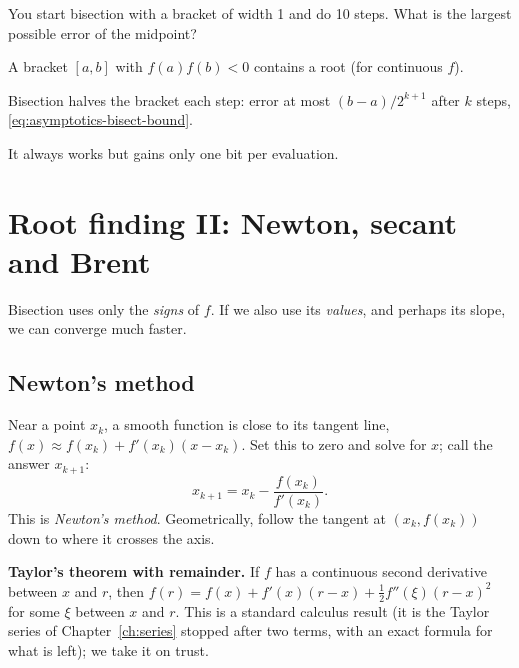 \begin{checkpoint}
You start bisection with a bracket of width 1 and do 10 steps. What is the largest possible error of the midpoint?
\end{checkpoint}

\begin{keyideas}
\item A bracket $[a,b]$ with $f(a)f(b)<0$ contains a root (for continuous $f$).
\item Bisection halves the bracket each step: error at most $(b-a)/2^{k+1}$ after $k$ steps, \cref{eq:asymptotics-bisect-bound}.
\item It always works but gains only one bit per evaluation.
\end{keyideas}

\section{Root finding II: Newton, secant and Brent}\label{sec:asymptotics-newton}

Bisection uses only the \emph{signs} of $f$. If we also use its \emph{values}, and perhaps its slope, we can converge much faster.

\subsection{Newton's method}

Near a point $x_k$, a smooth function is close to its tangent line, $f(x)\approx f(x_k)+f'(x_k)(x-x_k)$. Set this to zero and solve for $x$; call the answer $x_{k+1}$:
\begin{equation}
x_{k+1}=x_k-\frac{f(x_k)}{f'(x_k)} .
\label{eq:asymptotics-newton}
\end{equation}
This is \emph{Newton's method}. Geometrically, follow the tangent at $(x_k,f(x_k))$ down to where it crosses the axis.

\begin{beyond}
\textbf{Taylor's theorem with remainder.} If $f$ has a continuous second derivative between $x$ and $r$, then
$f(r)=f(x)+f'(x)(r-x)+\tfrac12f''(\xi)(r-x)^2$ for some $\xi$ between $x$ and $r$. This is a standard calculus result (it is the Taylor series of Chapter~\ref{ch:series} stopped after two terms, with an exact formula for what is left); we take it on trust.
\end{beyond}

